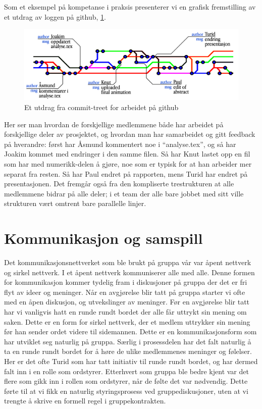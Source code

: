 Som et eksempel på kompetanse i praksis presenterer vi en grafisk fremstilling
av et utdrag av loggen på github, \cref{fig:github}.
\begin{figure}[h!]
  \begin{center}
    \includegraphics[width=1.1\textwidth]{github.png}
  \end{center}
  \caption{Et utdrag fra commit-treet for arbeidet på github}
  \label{fig:github}
\end{figure}
Her ser man hvordan de forskjellige medlemmene både har arbeidet på forskjellige
deler av prosjektet, og hvordan man har samarbeidet og gitt feedback på
hverandre: først har Åsmund kommentert noe i ``analyse.tex'', og så har Joakim kommet med
endringer i den samme filen. Så har Knut lastet opp en fil som har med
numerikk-delen å gjøre, noe som er typisk for at han arbeider mer separat fra
resten. Så har Paul endret på rapporten, mens Turid har endret på
presentasjonen. Det fremgår også fra den kompliserte trestrukturen at alle
medlemmene bidrar på alle deler; i et team der alle bare jobbet med sitt ville
strukturen vært omtrent bare parallelle linjer.

\section{Kommunikasjon og samspill}
Det kommunikasjonsnettverket som ble brukt på gruppa vår var åpent nettverk og sirkel nettverk. 
I et åpent nettverk kommuniserer alle med alle. Denne formen for kommunikasjon kommer tydelig fram 
i diskusjoner på gruppa der det er fri flyt av ideer og meninger. Når en avgjørelse blir tatt på 
gruppa starter vi ofte med en åpen diskusjon, og utvekslinger av meninger. Før en avgjørelse blir 
tatt har vi vanligvis hatt en runde rundt bordet der alle får uttrykt sin mening om saken. Dette er 
en form for sirkel nettverk, der et medlem uttrykker sin mening før han sender ordet videre til sidemannen.
 Dette er en kommunikasjonsform som har utviklet seg naturlig på gruppa. Særlig i prosessdelen har 
 det falt naturlig å ta en runde rundt bordet for å høre de ulike medlemmenes meninger og følelser. 
 Her er det ofte Turid som har tatt initiativ til runde rundt bordet, og har dermed falt inn i en 
 rolle som ordstyrer. Etterhvert som gruppa ble bedre kjent var det flere som gikk inn i rollen 
 som ordstyrer, når de følte det var nødvendig. Dette førte til at vi fikk en naturlig styringsprosess
  ved gruppediskusjoner, uten at vi trengte å skrive en formell regel i gruppekontrakten.

